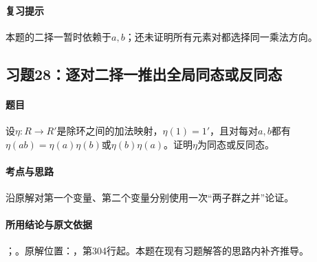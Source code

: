 \paragraph{复习提示}

本题的二择一暂时依赖于$a,b$；还未证明所有元素对都选择同一乘法方向。



\subsection{习题28：逐对二择一推出全局同态或反同态}

\label{ex:3:28}

\paragraph{题目}

设$\eta:R\to R'$是除环之间的加法映射，$\eta(1)=1'$，且对每对$a,b$都有$\eta(ab)=\eta(a)\eta(b)$或$\eta(b)\eta(a)$。证明$\eta$为同态或反同态。

\paragraph{考点与思路}

沿原解对第一个变量、第二个变量分别使用一次“两子群之并”论证。

\paragraph{所用结论与原文依据}

；。原解位置：，第304行起。本题在现有习题解答的思路内补齐推导。


